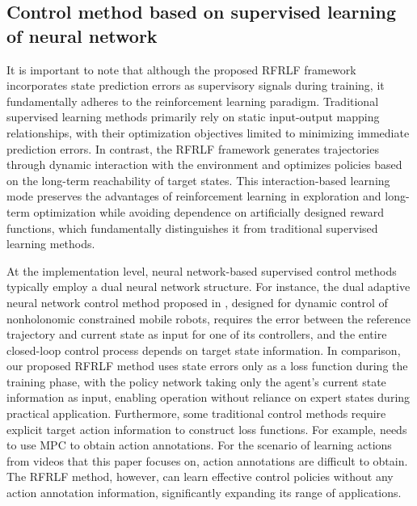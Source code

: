 \subsection{Control method based on supervised learning of neural network}
It is important to note that although the proposed RFRLF framework incorporates state prediction errors as supervisory signals during training, it fundamentally adheres to the reinforcement learning paradigm. Traditional supervised learning methods primarily rely on static input-output mapping relationships, with their optimization objectives limited to minimizing immediate prediction errors. In contrast, the RFRLF framework generates trajectories through dynamic interaction with the environment and optimizes policies based on the long-term reachability of target states. This interaction-based learning mode preserves the advantages of reinforcement learning in exploration and long-term optimization while avoiding dependence on artificially designed reward functions, which fundamentally distinguishes it from traditional supervised learning methods.

At the implementation level, neural network-based supervised control methods \cite{fei2017adaptive,zhang2020near} typically employ a dual neural network structure. For instance, the dual adaptive neural network control method proposed in \cite{fei2017adaptive}, designed for dynamic control of nonholonomic constrained mobile robots, requires the error between the reference trajectory and current state as input for one of its controllers, and the entire closed-loop control process depends on target state information. In comparison, our proposed RFRLF method uses state errors only as a loss function during the training phase, with the policy network taking only the agent's current state information as input, enabling operation without reliance on expert states during practical application. Furthermore, some traditional control methods require explicit target action information to construct loss functions. For example, \cite{zhang2020near} needs to use MPC to obtain action annotations. For the scenario of learning actions from videos that this paper focuses on, action annotations are difficult to obtain. The RFRLF method, however, can learn effective control policies without any action annotation information, significantly expanding its range of applications.